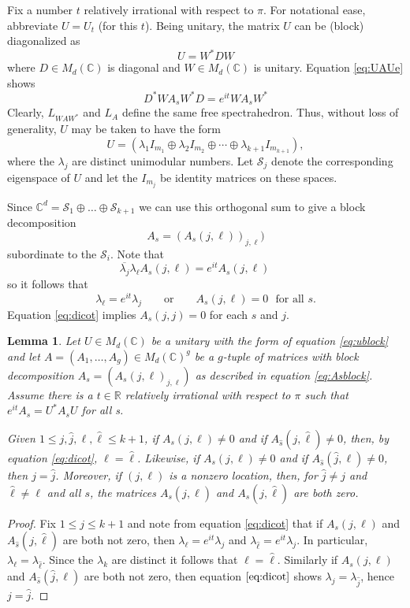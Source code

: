 \documentclass[12pt,makeidx]{amsart}
\newtheorem{lemma}[theorem]{Lemma}
\def\beq{\begin{equation}}
\def\eeq{\end{equation}}
\numberwithin{equation}{section}
\def\R{ {\mathbb{R}} }
\def\C{ {\mathbb{C}} }
\def\cS{{\mathcal S} }
\def\la{{\lambda}}
\def\cS{{\mathcal S}}
\begin{document}
 Fix a number $t$ relatively irrational with respect to $\pi$.
 For notational ease, abbreviate $U=U_t$ (for this $t$). Being unitary,
 the matrix $U$ can be (block) diagonalized as
\[
U=W^*DW
\]
where $D \in M_d(\C)$ is diagonal and $W \in M_d(\C)$ is unitary. Equation \eqref{eq:UAUe} shows
\[
D^*WA_sW^*D=e^{it}WA_sW^*
\]
Clearly, $L_{WAW^*}$ and $L_{A}$ define the same free spectrahedron. Thus, without loss of generality,  $U$ may be taken to have the form
\beq
\label{eq:ublock}
U = (\lambda_1 I_{m_1}\oplus \lambda_2 I_{m_2} \oplus \cdots \oplus
\lambda_{k+1} I_{m_{k+1}}),
\eeq
 where the $\lambda_j$ are distinct unimodular 
  numbers. Let $\mathcal{S}_j$ denote the corresponding eigenspace of $U$
   and let the $I_{m_j}$ be identity matrices on these spaces.

 Since $\C^d=\cS_1 \oplus \dots \oplus \cS_{k+1}$ we can use this orthogonal sum to give a block decomposition 
 \beq
\label{eq:Asblock}
A_s=( A_s(j,\ell) )_{j,\ell} )
\eeq
 subordinate to the $\cS_i$. 
 Note that 
 \beq
  \overline{\la_j} \la_\ell A_s(j,\ell)  = e^{i t} A_s(j,\ell) \qquad
 \eeq
so it follows that
 \beq
 \label{eq:dicot}
  \la_\ell  = e^{i t}   \la_j \qquad  \text{or}  
  \qquad A_s(j,\ell)=0 \ \ \ \text{for all } s.
 \eeq
 Equation \eqref{eq:dicot} implies  $A_s(j,j)=0$ for each $s$ and $j$. 
 

\begin{lemma}
\label{lem:atmostone}
Let $U \in M_d(\C)$ be a unitary with the form of equation \eqref{eq:ublock} and let $A=(A_1, \dots, A_g) \in M_d(\C)^g$ 
be a $g$-tuple of matrices with block decomposition $A_s=(A_s (j,\ell)_{j,\ell})$ as described in equation \eqref{eq:Asblock}.
Assume there is a $t \in \R$ relatively irrational with respect to $\pi$ such that
$e^{it}A_s=U^*A_s U$
for all s.

 Given $1\le j,\hat{j}, \ell,\hat{\ell}\le k+1$, if $A_s (j,\ell) \neq 0$
 and if $A_{\hat{s}} (j, \hat{\ell}) \neq 0$, then, by equation \eqref{eq:dicot}, $\ell= \hat{\ell}$.
Likewise, if $A_s (j, \ell) \neq 0$ and if $A_{\hat{s}} (\hat{j}, \ell) \neq 0$, then $j=\hat{j}$. 
Moreover, if $(j, \ell)$ is a nonzero location, then, for $\hat{j} \neq j$ and $\hat{\ell} \neq \ell$
and all $s$, the matrices $A_s (\hat{j}, \ell)$ and $A_s (j, \hat{\ell})$ are both zero.
\end{lemma}

\begin{proof}
Fix $1 \leq j \leq k+1$ and note from equation \eqref{eq:dicot} that if 
$A_s(j, \ell)$ and $A_{\hat{s}} (j, \hat{\ell})$ are both not zero, then
$\lambda_\ell=e^{it} \lambda_j$ and $\lambda_{\hat{\ell}}=e^{it} \lambda_j$. 
In particular,  $\lambda_\ell= \lambda_{\hat{\ell}}$. Since the $\lambda_k$ are distinct
it follows that $\ell=\hat{\ell}$. 
Similarly if $A_s (j, \ell)$ and $A_{\hat{s}} (\hat{j}, \ell)$ are both not zero, then equation $\eqref{eq:dicot}$
shows $\lambda_j= \lambda_{\hat{j}}$, hence $j=\hat{j}$.
\end{proof}
\end{document}
